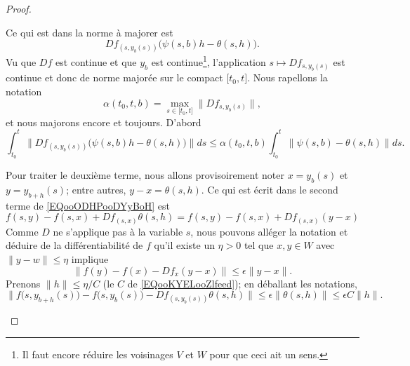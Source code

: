 \begin{proof}
\begin{subproof}
\begin{subproof}
			Ce qui est dans la norme à majorer est
			\begin{equation}
				Df_{(s,y_b(s))}\big( \psi(s,b)h-\theta(s,h) \big).
			\end{equation}
			Vu que \( Df\) est continue et que \( y_b\) est continue\footnote{Il faut encore réduire les voisinages \( V\) et \( W\) pour que ceci ait un sens.}, l'application \( s\mapsto Df_{s,y_b(s)}\) est continue et donc de norme majorée sur le compact \( \mathopen[ t_0 , t \mathclose]  \). Nous rapellons la notation
			\begin{equation}
				\alpha(t_0,t,b)=\max_{s\in\mathopen[ t_0 , t \mathclose]}\| Df_{s,y_b(s)} \|,
			\end{equation}
			et nous majorons encore et toujours. D'abord
			\begin{equation}
				\int_{t_0}^t\| Df_{(s,y_b(s))}\big( \psi(s,b)h-\theta(s,h) \big) \|ds\leq \alpha(t_0,t,b)\int_{t_0}^t\| \psi(s,b)-\theta(s,h) \|ds.
			\end{equation}


			Pour traiter le deuxième terme, nous allons provisoirement noter \( x=y_b(s)\) et \( y=y_{b+h}(s)\); entre autres, \( y-x=\theta(s,h)\). Ce qui est écrit dans le second terme de \eqref{EQooODHPooDYyBoH} est
			\begin{equation}
				f(s,y)-f(s,x)+Df_{(s,x)}\theta(s,h)=f(s,y)-f(s,x)+Df_{(s,x)}(y-x)
			\end{equation}
			Comme \( D\) ne s'applique pas à la variable \( s\), nous pouvons alléger la notation et déduire de la différentiabilité de \( f\) qu'il existe un \( \eta>0\) tel que \( x,y\in W\) avec \( \| y-w \|\leq \eta\) implique
			\begin{equation}
				\| f(y)-f(x)-Df_x(y-x) \|\leq \epsilon\| y-x \|.
			\end{equation}
			Prenons \( \| h \|\leq \eta/C\) (le \( C\) de \eqref{EQooKYELooZlfeed}); en déballant les notations,
			\begin{equation}
				\| f\big( s,y_{b+h}(s) \big)-f\big( s,y_b(s) \big) -Df_{(s,y_b(s))}\theta(s,h)\|\leq \epsilon\| \theta(s,h) \|\leq \epsilon C\| h \|.
			\end{equation}




\end{subproof}
\end{subproof}
\end{proof}
